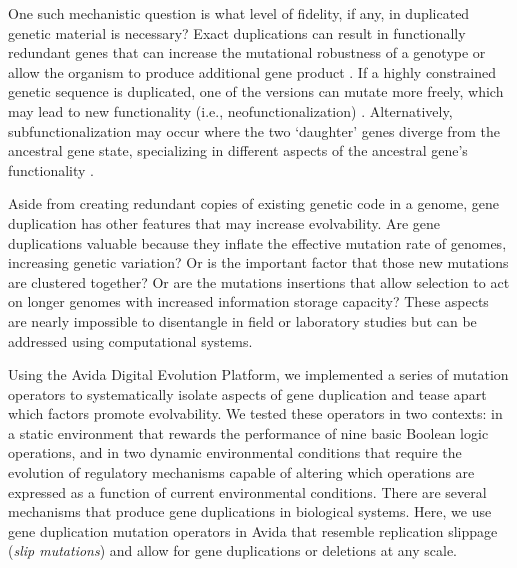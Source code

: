 One such mechanistic question is what level of fidelity, if any, in duplicated genetic material is necessary?
Exact duplications can result in functionally redundant genes that can increase the mutational robustness of a genotype \citep{Crow:2006role} or allow the organism to produce additional gene product \citep{Zhang:2003fw}.
If a highly constrained genetic sequence is duplicated, one of the versions can mutate more freely, which may lead to new functionality (i.e., neofunctionalization) \citep{Zhang:2003fw,Wagner:2003fk}.
Alternatively, subfunctionalization may occur where the two `daughter' genes diverge from the ancestral gene state, specializing in different aspects of the ancestral gene's functionality \citep{Zhang:2003fw}.

Aside from creating redundant copies of existing genetic code in a genome, gene duplication has other features that may increase evolvability.
Are gene duplications valuable because they inflate the effective mutation rate of genomes, increasing genetic variation?
Or is the important factor that those new mutations are clustered together?
Or are the mutations insertions that allow selection to act on longer genomes with increased information storage capacity?
These aspects are nearly impossible to disentangle in field or laboratory studies but can be addressed using computational systems.

Using the Avida Digital Evolution Platform, we implemented a series of mutation operators to systematically isolate aspects of gene duplication and tease apart which factors promote evolvability. We tested these operators in two %
contexts: in a static environment that rewards the performance of nine basic Boolean logic operations, and in two dynamic environmental conditions that require the evolution of regulatory mechanisms capable of altering which operations are expressed as a function of current environmental conditions. %
There are several mechanisms that produce gene duplications in biological systems. Here, we use gene duplication mutation operators in Avida that resemble replication slippage \citep{bzymek_instability_2001} (\textit{slip mutations}) and allow for gene duplications or deletions at any scale.

